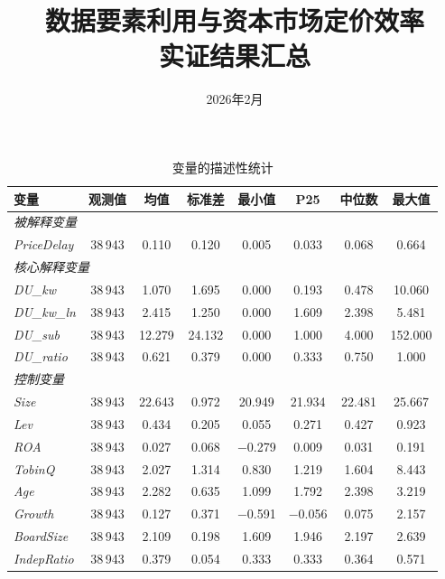 \documentclass[11pt,a4paper]{article}
\title{{\hei\Large 数据要素利用与资本市场定价效率} \\[8pt]
{\large 实证结果汇总}}
\author{}
\date{2026年2月}
\begin{document}
\maketitle
\thispagestyle{fancy}

\FloatBarrier

\begin{table}[htbp]
\centering
\caption{变量的描述性统计}
\label{tab:desc}
\small
\begin{tabular}{l*{7}{c}}
\toprule
变量 & 观测值 & 均值 & 标准差 & 最小值 & P25 & 中位数 & 最大值 \\
\midrule
\multicolumn{8}{l}{\textit{被解释变量}} \\
\textit{PriceDelay} & 38\,943 & 0.110 & 0.120 & 0.005 & 0.033 & 0.068 & 0.664 \\[4pt]
\multicolumn{8}{l}{\textit{核心解释变量}} \\
\textit{DU\_kw}      & 38\,943 & 1.070 & 1.695 & 0.000 & 0.193 & 0.478 & 10.060 \\
\textit{DU\_kw\_ln}  & 38\,943 & 2.415 & 1.250 & 0.000 & 1.609 & 2.398 & 5.481 \\
\textit{DU\_sub}     & 38\,943 & 12.279 & 24.132 & 0.000 & 1.000 & 4.000 & 152.000 \\
\textit{DU\_ratio}   & 38\,943 & 0.621 & 0.379 & 0.000 & 0.333 & 0.750 & 1.000 \\[4pt]
\multicolumn{8}{l}{\textit{控制变量}} \\
\textit{Size}        & 38\,943 & 22.643 & 0.972 & 20.949 & 21.934 & 22.481 & 25.667 \\
\textit{Lev}         & 38\,943 & 0.434 & 0.205 & 0.055 & 0.271 & 0.427 & 0.923 \\
\textit{ROA}         & 38\,943 & 0.027 & 0.068 & $-$0.279 & 0.009 & 0.031 & 0.191 \\
\textit{TobinQ}      & 38\,943 & 2.027 & 1.314 & 0.830 & 1.219 & 1.604 & 8.443 \\
\textit{Age}         & 38\,943 & 2.282 & 0.635 & 1.099 & 1.792 & 2.398 & 3.219 \\
\textit{Growth}      & 38\,943 & 0.127 & 0.371 & $-$0.591 & $-$0.056 & 0.075 & 2.157 \\
\textit{BoardSize}   & 38\,943 & 2.109 & 0.198 & 1.609 & 1.946 & 2.197 & 2.639 \\
\textit{IndepRatio}  & 38\,943 & 0.379 & 0.054 & 0.333 & 0.333 & 0.364 & 0.571 \\

\end{tabular}
\end{table}
\end{document}
